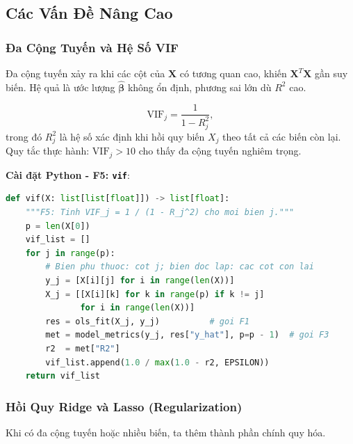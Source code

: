 ﻿\subsection{Các Vấn Đề Nâng Cao}


\subsubsection{Đa Cộng Tuyến và Hệ Số VIF}

Đa cộng tuyến xảy ra khi các cột của $\mathbf{X}$ có tương quan cao,
khiến $\mathbf{X}^T\mathbf{X}$ gần suy biến. Hệ quả là ước lượng
$\hat{\boldsymbol{\beta}}$ không ổn định, phương sai lớn dù $R^2$ cao.

\begin{tcolorbox}[mycodebox, colback=blue!3!white, colframe=blue!40!black,
    title={\textbf{Định nghĩa 1.4} - Variance Inflation Factor (VIF)}]
\begin{equation}
    \mathrm{VIF}_j = \frac{1}{1 - R_j^2},
    \label{eq:vif}
\end{equation}
trong đó $R_j^2$ là hệ số xác định khi hồi quy biến $X_j$ theo tất cả
các biến còn lại. Quy tắc thực hành: $\mathrm{VIF}_j > 10$ cho thấy
đa cộng tuyến nghiêm trọng.
\end{tcolorbox}

\textbf{Cài đặt Python - F5: \texttt{vif}}:

\begin{lstlisting}[language=Python, caption={Hàm \texttt{vif} - tính VIF cho từng biến, dùng F1 và F3}]
def vif(X: list[list[float]]) -> list[float]:
    """F5: Tinh VIF_j = 1 / (1 - R_j^2) cho moi bien j."""
    p = len(X[0])
    vif_list = []
    for j in range(p):
        # Bien phu thuoc: cot j; bien doc lap: cac cot con lai
        y_j = [X[i][j] for i in range(len(X))]
        X_j = [[X[i][k] for k in range(p) if k != j]
               for i in range(len(X))]
        res = ols_fit(X_j, y_j)          # goi F1
        met = model_metrics(y_j, res["y_hat"], p=p - 1)  # goi F3
        r2  = met["R2"]
        vif_list.append(1.0 / max(1.0 - r2, EPSILON))
    return vif_list
\end{lstlisting}

\subsubsection{Hồi Quy Ridge và Lasso (Regularization)}

Khi có đa cộng tuyến hoặc nhiều biến, ta thêm thành phần chính quy hóa.

